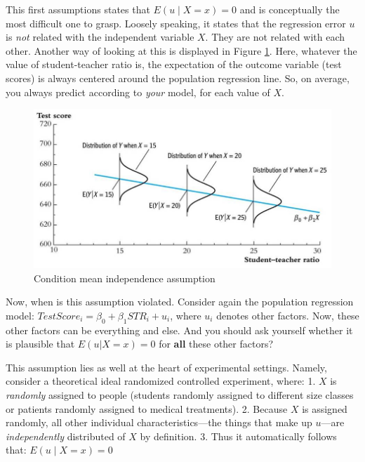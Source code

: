\documentclass[
]{book}
\begin{document}
This first assumptions states that \(E(u \mid X = x) = 0\) and is conceptually the most difficult one to grasp. Loosely speaking, it states that the regression error \(u\) is \emph{not} related with the independent variable \(X\). They are not related with each other. Another way of looking at this is displayed in Figure \ref{fig:ass1}. Here, whatever the value of student-teacher ratio is, the expectation of the outcome variable (test scores) is always centered around the population regression line. So, on average, you always predict according to \emph{your} model, for each value of \(X\).

\begin{figure}

{\centering \includegraphics[width=600px]{./figures/Lecture1_sheet25} 

}

\caption{Condition mean independence assumption}\label{fig:ass1}
\end{figure}

Now, when is this assumption violated. Consider again the population regression model: \(TestScore_i = \beta_0 + \beta_1 STR_i + u_i\), where \(u_i\) denotes other factors. Now, these other factors can be everything and else. And you should ask yourself whether it is plausible that \(E(u|X = x) = 0\) for \textbf{all} these other factors?

This assumption lies as well at the heart of experimental settings. Namely, consider a theoretical ideal randomized controlled experiment, where:
1. \(X\) is \emph{randomly} assigned to people (students randomly assigned to different size classes or patients randomly assigned to medical treatments).
2. Because \(X\) is assigned randomly, all other individual characteristics---the things that make up \(u\)---are \emph{independently} distributed of \(X\) by definition.
3. Thus it automatically follows that: \(E(u \mid X = x) = 0\)
\end{document}
